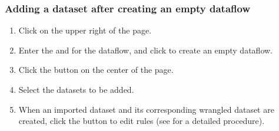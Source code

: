 \documentclass[letterpaper,10pt,english]{sphinxmanual}
\begin{document}
\subsubsection{Adding a dataset after creating an empty dataflow}
\label{\detokenize{discovery/part07/add_datasets:dataflow-creation-first}}\label{\detokenize{discovery/part07/add_datasets:id2}}\begin{enumerate}
\def\theenumi{\arabic{enumi}}
\def\labelenumi{\theenumi .}
\makeatletter\def\p@enumii{\p@enumi \theenumi .}\makeatother
\item {} 
Click  on the upper right of the  page.

\item {} 
Enter the  and  for the dataflow, and click  to create an empty dataflow.
\begin{quote}

\begin{figure}[H]
\centering

\noindent{}
\end{figure}
\end{quote}

\item {} 
Click the  button on the center of the page.
\begin{quote}

\begin{figure}[H]
\centering

\noindent{}
\end{figure}
\end{quote}

\item {} 
Select the datasets to be added.
\begin{quote}

\begin{figure}[H]
\centering

\noindent{}
\end{figure}
\end{quote}

\item {} 
When an imported dataset and its corresponding wrangled dataset are created, click the  button to edit rules (see {\hyperref[\detokenize{discovery/part07/edit_rules::doc}]{}} for a detailed procedure).
\begin{quote}

\begin{figure}[H]
\centering

\noindent{}
\end{figure}
\end{quote}

\end{enumerate}
\end{document}
